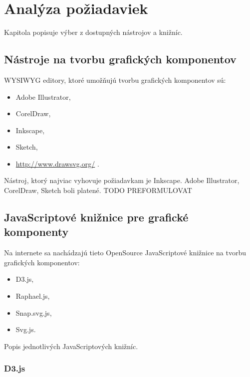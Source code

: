 \chapter{Analýza požiadaviek}
Kapitola popisuje výber z dostupných nástrojov a knižníc. 

\section{Nástroje na tvorbu grafických komponentov}

\acs{WYSIWYG} editory, ktoré umožňujú tvorbu grafických komponentov sú: 

\begin{itemize}
\item Adobe Illustrator, 
\item CorelDraw, 
\item Inkscape,
\item Sketch, 
\item \url{http://www.drawsvg.org/} .
\end{itemize}

Nástroj, ktorý najviac vyhovuje  požiadavkam je Inkscape. 
Adobe Illustrator, CorelDraw, Sketch boli platené.  
TODO PREFORMULOVAT



\section{JavaScriptové knižnice pre grafické komponenty}
Na internete sa nachádzajú tieto OpenSource JavaScriptové knižnice na tvorbu grafických komponentov: 
\begin{itemize}
	\item \acs{D3}.js, 
	\item Raphael.js, 
	\item Snap.svg.js,  
	\item Svg.js. 
\end{itemize}



Popis jednotlivých JavaScriptových knižníc.



\subsection{D3.js}

